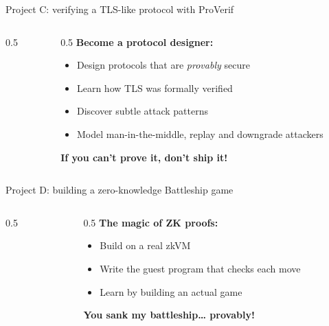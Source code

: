 \ifdefined\PRESENTATION\else\PassOptionsToClass{handout}{beamer}\fi\documentclass[aspectratio=169, lualatex]{beamer}
\begin{document}
\begin{frame}{Project C: verifying a TLS-like protocol with ProVerif}
	\begin{columns}[c]
		\begin{column}{0.5\textwidth}
		\end{column}
		\begin{column}{0.5\textwidth}
			\textbf{Become a protocol designer:}
			\begin{itemize}[<+->]
				\item Design protocols that are \textit{provably} secure
				\item Learn how TLS was formally verified
				\item Discover subtle attack patterns
				\item Model man-in-the-middle, replay and downgrade attackers
			\end{itemize}
			\vspace{0.5cm}
			\textcolor{cipherprimary}{\textbf{If you can't prove it, don't ship it!}}
		\end{column}
	\end{columns}
\end{frame}

\begin{frame}{Project D: building a zero-knowledge Battleship game}
	\begin{columns}[c]
		\begin{column}{0.5\textwidth}
		\end{column}
		\begin{column}{0.5\textwidth}
			\textbf{The magic of ZK proofs:}
			\begin{itemize}[<+->]
				\item Build on a real zkVM
				\item Write the guest program that checks each move
				\item Learn by building an actual game
			\end{itemize}
			\vspace{0.5cm}
			\textcolor{cipherprimary}{\textbf{You sank my battleship\ldots{} provably!}}
		\end{column}
	\end{columns}
\end{frame}
\end{document}
